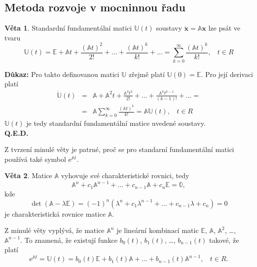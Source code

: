 \documentclass[a4paper, 12pt]{book}
\theoremstyle{definition}
\newtheorem{theorem}{Věta}[section]
\def\vc#1{\mathbf{\boldsymbol{#1}}}     %
\def\tn#1{{\mathbb{#1}}}    %
\begin{document}
\subsection{Metoda rozvoje v mocninnou řadu}
\begin{theorem}
Standardní fundamentální matici ${\tn U}(t)$ soustavy 
$\dot{\vc x}={\tn A}\vc x$ lze psát ve tvaru
\begin{equation}
{\tn U}(t) = {\tn E}+{\tn A}t+\frac{({\tn A}t)^2}{2!}+\dots+\frac{({\tn A}t)^k}{k!}+\dots=\sum_{k=0}^\infty\frac{({\tn A}t)^k}{k!}, ~~~~t\in R
\end{equation}
\end{theorem}
{\bf Důkaz:}
Pro takto definovanou matici $\tn U$ zřejmě platí ${\tn U}(0)={\tn E}$. Pro 
její derivaci platí
\begin{eqnarray*}
\dot{\tn U}(t) &=& {\tn A}+{\tn A}^2t+\frac{{\tn A}^3t^2}{2!}+\dots+\frac{{\tn A}^kt^{k-1}}{(k-1)!}+\dots=\\
&=&{\tn A}\sum_{k=0}^\infty\frac{({\tn A}t)^k}{k!}={\tn A}{\tn U}(t), ~~~~t\in R
\end{eqnarray*}
${\tn U}(t)$ je tedy standardní fundamentální matice uvedené soustavy.\\
{\bf Q.E.D.}

Z tvrzení minulé věty je patrné, proč se pro standarní fundamentální matici 
používá také symbol $\mathrm{e}^{{\tn A}t}$.

\begin{theorem}
Matice ${\tn A}$ vyhovuje své charakteristické rovnici, tedy
\begin{equation}
{\tn A}^n+c_1{\tn A}^{n-1}+\dots+c_{n-1}{\tn A}+c_n{\tn E}={\tn 0},
\end{equation}
kde
\begin{equation}
\det({\tn A}-\lambda{\tn E}) = (-1)^n (\lambda^n+c_1\lambda^{n-1}+\dots+c_{n-1}\lambda+c_n) = 0
\end{equation}
je charakteristická rovnice matice $\tn A$.
\end{theorem}

Z minulé věty vyplývá, že matice ${\tn A}^n$ je lineární kombinací matic $\tn E$,
$\tn A$, ${\tn A}^2$, \dots, ${\tn A}^{n-1}$. To znamená, že existují funkce 
$b_0(t)$, $b_1(t)$, \dots, $b_{n-1}(t)$ takové, že platí
\begin{equation}\label{4.5.4}
\mathrm{e}^{{\tn A}t} = {\tn U}(t) = b_0(t){\tn E}+b_1(t){\tn A}+\dots+b_{n-1}(t){\tn A}^{n-1}, ~~~~t\in R.
\end{equation}
\end{document}
